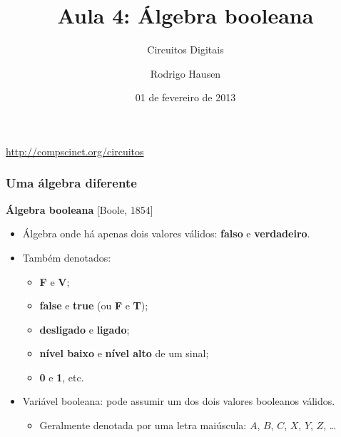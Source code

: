 \documentclass{beamer}
\title{Aula 4: Álgebra booleana}
\subtitle{Circuitos Digitais}
\author{Rodrigo Hausen}
\institute{CMCC -- UFABC}
\date{01 de fevereiro de 2013}
\begin{document}
\begin{frame}
\maketitle

\vspace{-1cm}

\begin{center}
\url{http://compscinet.org/circuitos}
\end{center}

\end{frame}


\begin{frame}
 \frametitle{Uma álgebra diferente}

\begin{minipage}{0.62\textwidth}
 \textbf{Álgebra booleana} [Boole, 1854]
 \begin{itemize}
 \item Álgebra onde há apenas dois valores válidos: \textbf{falso} e
\textbf{verdadeiro}.
 \pause
 \item Também denotados:
 \begin{itemize}
   \item \textbf{F} e \textbf{V};
   \pause
   \item \textbf{false} e \textbf{true} (ou \textbf{F} e \textbf{T});
   \pause
   \item \textbf{desligado} e \textbf{ligado};
   \pause
   \item \textbf{nível baixo} e \textbf{nível alto} de um sinal;
   \pause
   \item \textbf{0} e \textbf{1}, etc.
 \end{itemize}
\pause
 \item Variável booleana: pode assumir um dos dois valores booleanos válidos.
    \begin{itemize}
        \item Geralmente denotada por uma letra maiúscula: $A$, $B$, $C$, $X$, $Y$, $Z$, \ldots
    \end{itemize}
 \end{itemize}
\end{minipage}
%
\pause
\begin{minipage}{0.37\textwidth}

\end{minipage}
\end{frame}
\end{document}
